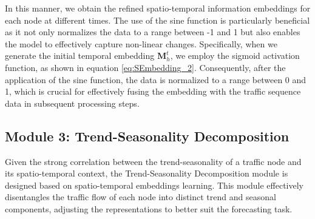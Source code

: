 In this manner, we obtain the refined spatio-temporal information embeddings for each node at different times. The use of the sine function is particularly beneficial as it not only normalizes the data to a range between -1 and 1 but also enables the model to effectively capture non-linear changes. Specifically, when we generate the initial temporal embedding $\mathbf{M}^{t}_{h}$, we employ the sigmoid activation function, as shown in equation \ref{eq:SEmbedding_2}. Consequently, after the application of the sine function, the data is normalized to a range between 0 and 1, which is crucial for effectively fusing the embedding with the traffic sequence data in subsequent processing steps.

\subsection{Module 3: Trend-Seasonality Decomposition}
Given the strong correlation between the trend-seasonality of a traffic node and its spatio-temporal context, the Trend-Seasonality Decomposition module is designed based on spatio-temporal embeddings learning. This module effectively disentangles the traffic flow of each node into distinct trend and seasonal components, adjusting the representations to better suit the forecasting task.

